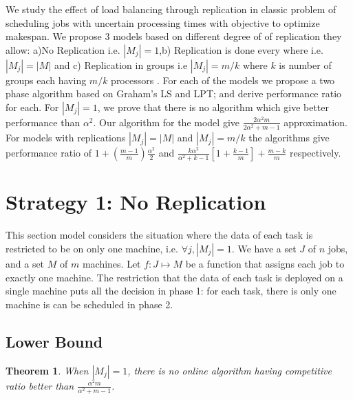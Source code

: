 \documentclass[10pt, conference, compsocconf]{IEEEtran}
\newtheorem{theorem}{Theorem}
\begin{document}
We study the effect of load balancing through replication in classic
problem of scheduling jobs with uncertain processing times with
objective to optimize makespan. We propose 3 models based on different
degree of of replication they allow: a)No Replication i.e. $|M_j|=1
$,b) Replication is done every where i.e.$|M_j|=|M|$ and c)
Replication in groups i.e $|M_j|= m/k$ where $k$ is number of groups
each having $m/k$ processors . For each of the models we propose a two
phase algorithm based on Graham's LS and LPT; and derive performance
ratio for each. For $|M_j|=1 $, we prove that there is no algorithm
which give better performance than $\alpha^2$. Our algorithm for the
model give $\frac{2\alpha^{2}m}{2\alpha^{2}+ m-1}$ approximation. For
models with replications $|M_j|=|M|$ and $|M_j|= m/k$ the algorithms
give performance ratio of $ 1 + (\frac{m-1}{m})\frac{\alpha^{2}}{2}$
and $\frac{k\alpha^{2}}{\alpha^{2}+k-1}\left[1+ {\frac{k-1}{m}}
\right]+ {\frac{m-k}{m}}$ respectively.

\section{Strategy 1: No Replication}\label{sec4}


This section model considers the situation where the data of each task
is restricted to be on only one machine, i.e. $\forall j, |M_j|=1$.
We have a set $J$ of $ n$ jobs, and a set $M$ of $m$ machines.  Let $f
: J \mapsto M$ be a function that assigns each job to exactly one
machine. The restriction that the data of each task is deployed on a
single machine puts all the decision in phase 1: for each task,
there is only one machine is can be scheduled in phase 2.

\subsection{Lower Bound}


\begin{theorem}
\label{th:model1-lb}
  When $|M_j| = 1$, there is no online algorithm having competitive
  ratio better than $\frac{\alpha^{2}m }{\alpha^{2} + m-1}$.
\end{theorem}
 
\end{document}
